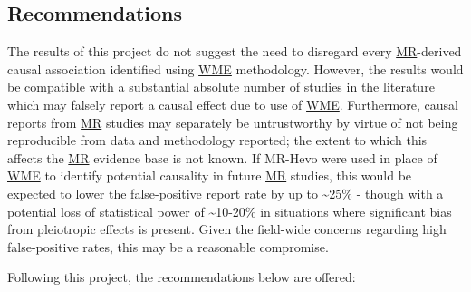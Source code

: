 \documentclass[
]{article}
\begin{document}
\subsection{Recommendations}\label{recommendations}

The results of this project do not suggest the need to disregard every \hyperref[acronyms_MR]{MR}-derived causal association identified using \hyperref[acronyms_WME]{WME} methodology. However, the results would be compatible with a substantial absolute number of studies in the literature which may falsely report a causal effect due to use of \hyperref[acronyms_WME]{WME}. Furthermore, causal reports from \hyperref[acronyms_MR]{MR} studies may separately be untrustworthy by virtue of not being reproducible from data and methodology reported; the extent to which this affects the \hyperref[acronyms_MR]{MR} evidence base is not known. If MR-Hevo were used in place of \hyperref[acronyms_WME]{WME} to identify potential causality in future \hyperref[acronyms_MR]{MR} studies, this would be expected to lower the false-positive report rate by up to \textasciitilde25\% - though with a potential loss of statistical power of \textasciitilde10-20\% in situations where significant bias from pleiotropic effects is present. Given the field-wide concerns regarding high false-positive rates, this may be a reasonable compromise.

Following this project, the recommendations below are offered:
\end{document}
